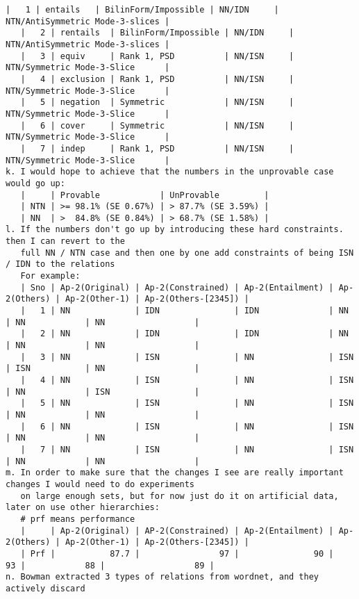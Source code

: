 \documentclass[12pt,answers]{exam} %
\begin{document}
{\begin{Verbatim}[fontsize=\small]
   |   1 | entails   | BilinForm/Impossible | NN/IDN     | NTN/AntiSymmetric Mode-3-slices |
   |   2 | rentails  | BilinForm/Impossible | NN/IDN     | NTN/AntiSymmetric Mode-3-slices |
   |   3 | equiv     | Rank 1, PSD          | NN/ISN     | NTN/Symmetric Mode-3-Slice      |
   |   4 | exclusion | Rank 1, PSD          | NN/ISN     | NTN/Symmetric Mode-3-Slice      |
   |   5 | negation  | Symmetric            | NN/ISN     | NTN/Symmetric Mode-3-Slice      |
   |   6 | cover     | Symmetric            | NN/ISN     | NTN/Symmetric Mode-3-Slice      |
   |   7 | indep     | Rank 1, PSD          | NN/ISN     | NTN/Symmetric Mode-3-Slice      |
k. I would hope to achieve that the numbers in the unprovable case would go up:
   |     | Provable            | UnProvable         |
   | NTN | >= 98.1% (SE 0.67%) | > 87.7% (SE 3.59%) |
   | NN  | >  84.8% (SE 0.84%) | > 68.7% (SE 1.58%) |
l. If the numbers don't go up by introducing these hard constraints. then I can revert to the
   full NN / NTN case and then one by one add constraints of being ISN / IDN to the relations
   For example:
   | Sno | Ap-2(Original) | Ap-2(Constrained) | Ap-2(Entailment) | Ap-2(Others) | Ap-2(Other-1) | Ap-2(Others-[2345]) |
   |   1 | NN             | IDN               | IDN              | NN           | NN            | NN                  |
   |   2 | NN             | IDN               | IDN              | NN           | NN            | NN                  |
   |   3 | NN             | ISN               | NN               | ISN          | ISN           | NN                  |
   |   4 | NN             | ISN               | NN               | ISN          | NN            | ISN                 |
   |   5 | NN             | ISN               | NN               | ISN          | NN            | NN                  |
   |   6 | NN             | ISN               | NN               | ISN          | NN            | NN                  |
   |   7 | NN             | ISN               | NN               | ISN          | NN            | NN                  |
m. In order to make sure that the changes I see are really important changes I would need to do experiments
   on large enough sets, but for now just do it on artificial data, later on use other hierarchies:
   # prf means performance
   |     | Ap-2(Original) | AP-2(Constrained) | Ap-2(Entailment) | Ap-2(Others) | Ap-2(Other-1) | Ap-2(Others-[2345]) |
   | Prf |           87.7 |                97 |               90 |           93 |            88 |                  89 |
n. Bowman extracted 3 types of relations from wordnet, and they actively discard

\end{Verbatim}}
\end{document}
